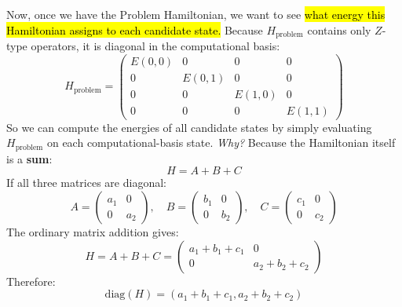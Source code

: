 \begin{deepeningbox}
    \highspace
    Now, once we have the Problem Hamiltonian, we want to see \hl{what energy this Hamiltonian assigns to each candidate state.} Because $H_{\text{problem}}$ contains only $Z$-type operators, it is diagonal in the computational basis:
    \begin{equation*}
        H_{\text{problem}} =
        \begin{pmatrix}
            E(0,0) & 0 & 0 & 0 \\
            0 & E(0,1) & 0 & 0 \\
            0 & 0 & E(1,0) & 0 \\
            0 & 0 & 0 & E(1,1)
        \end{pmatrix}
    \end{equation*}
    So we can compute the energies of all candidate states by simply evaluating $H_{\text{problem}}$ on each computational-basis state. \emph{Why?} Because the Hamiltonian itself is a \textbf{sum}:
    \begin{equation*}
        H = A + B + C
    \end{equation*}
    If all three matrices are diagonal:
    \begin{equation*}
        A =
        \begin{pmatrix}
            a_1 & 0 \\
            0 & a_2
        \end{pmatrix}, \quad
        B =
        \begin{pmatrix}
            b_1 & 0 \\
            0 & b_2
        \end{pmatrix}, \quad
        C =
        \begin{pmatrix}
            c_1 & 0 \\
            0 & c_2
        \end{pmatrix}
    \end{equation*}
    The ordinary matrix addition gives:
    \begin{equation*}
        H = A + B + C =
        \begin{pmatrix}
            a_1 + b_1 + c_1 & 0 \\
            0 & a_2 + b_2 + c_2
        \end{pmatrix}
    \end{equation*}
    Therefore:
    \begin{equation*}
        \mathrm{diag}(H) = \left(
            a_1 + b_1 + c_1, a_2 + b_2 + c_2
        \right)
    \end{equation*}
\end{deepeningbox}

